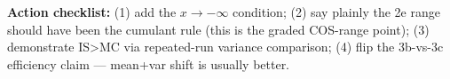 \documentclass[
  11pt,
]{article}
\begin{document}
\textbf{Action checklist:} (1) add the \(x → −∞\) condition; (2) say
plainly the 2e range should have been the cumulant rule (this is the
graded COS-range point); (3) demonstrate IS\textgreater MC via
repeated-run variance comparison; (4) flip the 3b-vs-3c efficiency claim
--- mean+var shift is usually better.
\end{document}

